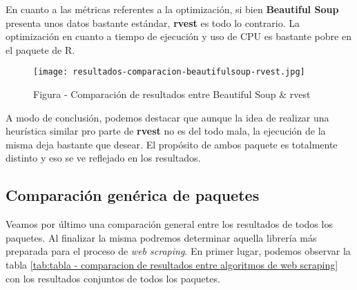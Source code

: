 En cuanto a las métricas referentes a la optimización, si bien \textbf{Beautiful Soup} presenta unos datos
bastante estándar, \textbf{rvest} es todo lo contrario. La optimización en cuanto a tiempo de ejecución y
uso de CPU es bastante pobre en el paquete de R.

\begin{figure}[tphb]
    \centering
    \texttt{[image: resultados-comparacion-beautifulsoup-rvest.jpg]}
    \caption{Figura - Comparación de resultados entre Beautiful Soup \& rvest}
    \label{img:figura - comparacion de resultados entre beautiful soup y rvest}
\end{figure}

A modo de conclusión, podemos destacar que aunque la idea de realizar una heurística similar pro parte de
\textbf{rvest} no es del todo mala, la ejecución de la misma deja bastante que desear. El propósito de ambos
paquete es totalmente distinto y eso se ve reflejado en los resultados.

\subsection{Comparación genérica de paquetes}
\label{subsec:comparacion generica de paquetes}

Veamos por último una comparación general entre los resultados de todos los paquetes. Al finalizar la
misma podremos determinar aquella librería más preparada para el proceso de \emph{web scraping}. En primer
lugar, podemos observar la tabla \ref{tab:tabla - comparacion de resultados entre algoritmos de web scraping}
con los resultados conjuntos de todos los paquetes.

